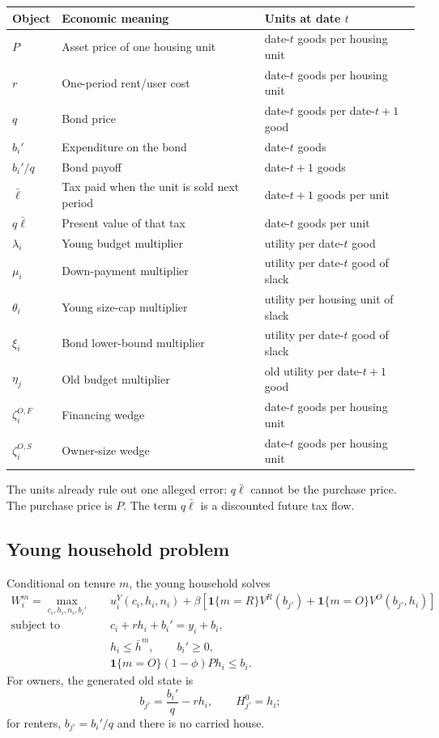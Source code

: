 \documentclass[11pt]{article}
\newcommand{\1}{\mathbf 1}
\newcommand{\ellbar}{\bar\ell}
\begin{document}
\begin{center}
\renewcommand{\arraystretch}{1.15}
\begin{tabularx}{\textwidth}{@{}L{0.12\textwidth}L{0.39\textwidth}Y@{}}
\toprule
Object & Economic meaning & Units at date $t$ \\
\midrule
$P$ & Asset price of one housing unit & date-$t$ goods per housing unit \\
$r$ & One-period rent/user cost & date-$t$ goods per housing unit \\
$q$ & Bond price & date-$t$ goods per date-$t+1$ good \\
$b_i'$ & Expenditure on the bond & date-$t$ goods \\
$b_i'/q$ & Bond payoff & date-$t+1$ goods \\
$\ellbar$ & Tax paid when the unit is sold next period & date-$t+1$ goods per unit \\
$q\ellbar$ & Present value of that tax & date-$t$ goods per unit \\
$\lambda_i$ & Young budget multiplier & utility per date-$t$ good \\
$\mu_i$ & Down-payment multiplier & utility per date-$t$ good of slack \\
$\theta_i$ & Young size-cap multiplier & utility per housing unit of slack \\
$\xi_i$ & Bond lower-bound multiplier & utility per date-$t$ good of slack \\
$\eta_j$ & Old budget multiplier & old utility per date-$t+1$ good \\
$\zeta_i^{O,F}$ & Financing wedge & date-$t$ goods per housing unit \\
$\zeta_i^{O,S}$ & Owner-size wedge & date-$t$ goods per housing unit \\
\bottomrule
\end{tabularx}
\end{center}

The units already rule out one alleged error: $q\ellbar$ cannot be the purchase
price. The purchase price is $P$. The term $q\ellbar$ is a discounted future
tax flow.

\subsection{Young household problem}

Conditional on tenure $m$, the young household solves
\begin{align}
W_i^m=\max_{c_i,h_i,n_i,b_i'}\quad
&u_i^Y(c_i,h_i,n_i)
+\beta\left[\1\{m=R\}V^R(b_{j'})
+\1\{m=O\}V^O(b_{j'},h_i)\right] \\
\text{subject to}\quad
&c_i+r h_i+b_i'=y_i+b_i, \label{eq:young_budget}\\
&h_i\le \bar h^m,\qquad b_i'\ge0, \label{eq:young_bounds}\\
&\1\{m=O\}(1-\phi)Ph_i\le b_i. \label{eq:dp}
\end{align}
For owners, the generated old state is
\begin{equation}
b_{j'}=\frac{b_i'}q-rh_i,
\qquad H_{j'}^0=h_i;
\label{eq:owner_transition}
\end{equation}
for renters, $b_{j'}=b_i'/q$ and there is no carried house.
\end{document}
